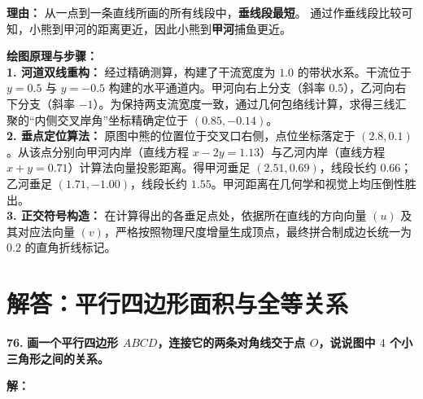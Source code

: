 \textbf{理由：} 从一点到一条直线所画的所有线段中，\textbf{垂线段最短}。
通过作垂线段比较可知，小熊到甲河的距离更近，因此小熊到\textbf{甲河}捕鱼更近。

\vspace{0.4cm}
{\small\color{blue!70!black}
\textbf{绘图原理与步骤：}\\
\textbf{1. 河道双线重构：} 经过精确测算，构建了干流宽度为 $1.0$ 的带状水系。干流位于 $y=0.5$ 与 $y=-0.5$ 构建的水平通道内。甲河向右上分支（斜率 $0.5$），乙河向右下分支（斜率 $-1$）。为保持两支流宽度一致，通过几何包络线计算，求得三线汇聚的“内侧交叉岸角”坐标精确定位于 $(0.85, -0.14)$。\\
\textbf{2. 垂点定位算法：} 原图中熊的位置位于交叉口右侧，点位坐标落定于 $(2.8, 0.1)$。从该点分别向甲河内岸（直线方程 $x - 2y = 1.13$）与乙河内岸（直线方程 $x + y = 0.71$）计算法向量投影距离。得甲河垂足 $(2.51, 0.69)$，线段长约 $0.66$；乙河垂足 $(1.71, -1.00)$，线段长约 $1.55$。甲河距离在几何学和视觉上均压倒性胜出。\\
\textbf{3. 正交符号构造：} 在计算得出的各垂足点处，依据所在直线的方向向量 $(u)$ 及其对应法向量 $(v)$，严格按照物理尺度增量生成顶点，最终拼合制成边长统一为 $0.2$ 的直角折线标记。
}

\newpage



\newpage

\section{解答：平行四边形面积与全等关系}

\vspace{0.6cm}

\textbf{\LARGE 76.} \textbf{画一个平行四边形 $ABCD$，连接它的两条对角线交于点 $O$，说说图中 $4$ 个小三角形之间的关系。}

\vspace{0.4cm}
\textbf{解：}

